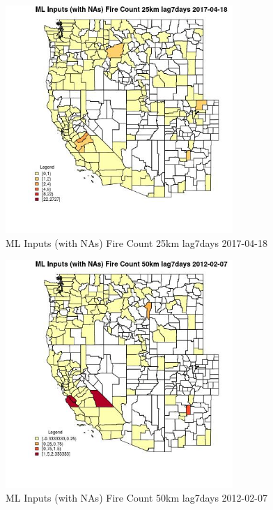 \begin{figure} 
\centering  
\includegraphics[width=0.77\textwidth]{Code_Outputs/Report_ML_input_PM25_Step4_part_f_de_duplicated_aveswNAs_CountyFire_Count_25km_lag7daysMean2017-04-18.jpg} 
\caption{\label{fig:Report_ML_input_PM25_Step4_part_f_de_duplicated_aveswNAsCountyFire_Count_25km_lag7daysMean2017-04-18}ML Inputs (with NAs) Fire Count 25km lag7days 2017-04-18} 
\end{figure} 
 

\begin{figure} 
\centering  
\includegraphics[width=0.77\textwidth]{Code_Outputs/Report_ML_input_PM25_Step4_part_f_de_duplicated_aveswNAs_CountyFire_Count_50km_lag7daysMean2012-02-07.jpg} 
\caption{\label{fig:Report_ML_input_PM25_Step4_part_f_de_duplicated_aveswNAsCountyFire_Count_50km_lag7daysMean2012-02-07}ML Inputs (with NAs) Fire Count 50km lag7days 2012-02-07} 
\end{figure} 
 

